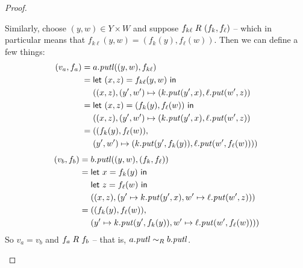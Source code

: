 \begin{defn}[$R$-similarity]
\begin{theorem}
\begin{lemma}
\begin{theorem}[No products]
\begin{lemma}
\begin{defn}
\begin{theorem}
\begin{theorem}
\begin{corollary}[Hylomorphism]
\begin{defn}
\begin{defn}
\begin{defn}[Symmetrization]
\begin{proof}
\begin{longenum}
Similarly, choose $(y,w) \in Y \times W$ and suppose $f_{k\ell} \mathrel{R_{}}
(f_k,f_\ell)$ -- which in particular means that
$f_{k\ell}(y,w)=(f_k(y),f_\ell(w))$. Then we can define a few things:
\begin{align*}
    (v_a,f_a) ={}
    & a.\mathit{putl}((y,w),f_{k\ell}) \\
    ={}
    & \mathsf{let}\  (x,z) = f_{k\ell}(y,w) \ \mathsf{in} \\
    & ((x,z), (y',w') \mapsto (k.\mathit{put}(y',x),\ell.\mathit{put}(w',z)) \\
    ={}
    & \mathsf{let}\  (x,z) = (f_k(y),f_\ell(w)) \ \mathsf{in} \\
    & ((x,z), (y',w') \mapsto (k.\mathit{put}(y',x),\ell.\mathit{put}(w',z)) \\
    ={}
    & ((f_k(y),f_\ell(w)), \\
    & (y',w') \mapsto (k.\mathit{put}(y',f_k(y)),\ell.\mathit{put}(w',f_\ell(w)))) \\
\end{align*}
\begin{align*}
    (v_b,f_b) ={}
    & b.\mathit{putl}((y,w),(f_k,f_\ell)) \\
    ={}
    & \mathsf{let}\  x = f_k(y) \ \mathsf{in} \\
    & \mathsf{let}\  z = f_\ell(w) \ \mathsf{in} \\
    & ((x,z),(y' \mapsto k.\mathit{put}(y',x),w' \mapsto \ell.\mathit{put}(w',z))) \\
    ={}
    & ((f_k(y),f_\ell(w)), \\
    & (y' \mapsto k.\mathit{put}(y',f_k(y)),w' \mapsto \ell.\mathit{put}(w',f_\ell(w))))
\end{align*}
So $v_a=v_b$ and $f_a \mathrel{R_{}} f_b$ -- that is, $a.\mathit{putl} \sim_R b.\mathit{putl}$.


\end{longenum}
\end{proof}
\end{defn}
\end{defn}
\end{defn}
\end{corollary}
\end{theorem}
\end{theorem}
\end{defn}
\end{lemma}
\end{theorem}
\end{lemma}
\end{theorem}
\end{defn}
